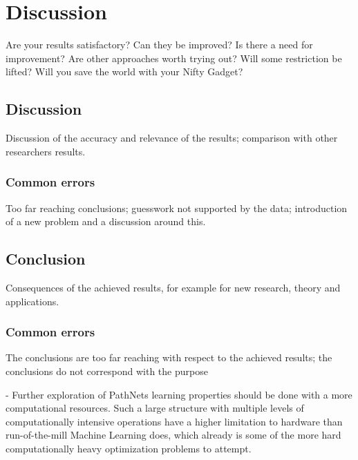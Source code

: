 \chapter{Discussion}
Are your results satisfactory? 
Can they be improved? 
Is there a need for improvement? 
Are other approaches worth trying out? 
Will some restriction be lifted? 
Will you save the world with your Nifty Gadget? 

\section{Discussion} 
Discussion of the accuracy and relevance of the results; comparison with other researchers results. 
\subsection{Common errors}
Too far reaching conclusions; guesswork not supported by the data; introduction of a new problem and a discussion around this.  

\section{Conclusion} 
Consequences of the achieved results, for example for new research, theory and applications. 

\subsection{Common errors}
The conclusions are too far reaching with respect to the achieved results; the conclusions do not correspond with the purpose


- Further exploration of PathNets learning properties should be done with a more computational resources. Such a large structure with multiple levels of computationally intensive operations have a higher limitation to hardware than run-of-the-mill Machine Learning does, which already is some of the more hard computationally heavy optimization problems to attempt.
